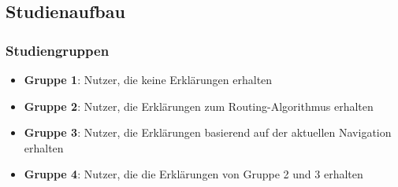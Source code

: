 \subsection{Studienaufbau}

\subsubsection*{Studiengruppen}

\begin{itemize}
    \item \textbf{Gruppe 1}: Nutzer, die keine Erklärungen erhalten
    \item \textbf{Gruppe 2}: Nutzer, die Erklärungen zum Routing-Algorithmus erhalten
    \item \textbf{Gruppe 3}: Nutzer, die Erklärungen basierend auf der aktuellen Navigation erhalten
    \item \textbf{Gruppe 4}: Nutzer, die die Erklärungen von Gruppe 2 und 3 erhalten
\end{itemize}